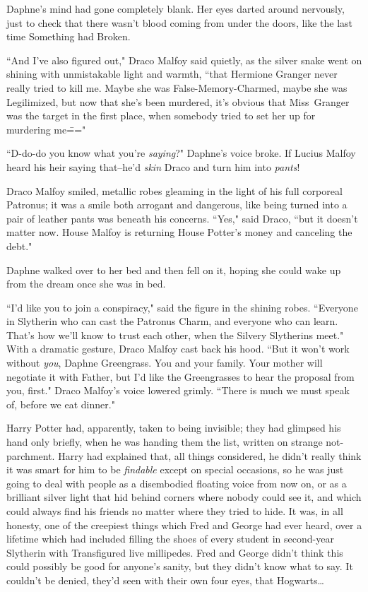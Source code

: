 Daphne's mind had gone completely blank. Her eyes darted around nervously, just to check that there wasn't blood coming from under the doors, like the last time Something had Broken.

``And I've also figured out," Draco Malfoy said quietly, as the silver snake went on shining with unmistakable light and warmth, ``that Hermione Granger never really tried to kill me. Maybe she was False-Memory-Charmed, maybe she was Legilimized, but now that she's been murdered, it's obvious that Miss~Granger was the target in the first place, when somebody tried to set her up for murdering me\==="

``D-do-do you know what you're \emph{saying}?" Daphne's voice broke. If Lucius Malfoy heard his heir saying that\---he'd \emph{skin} Draco and turn him into \emph{pants}!

Draco Malfoy smiled, metallic robes gleaming in the light of his full corporeal Patronus; it was a smile both arrogant and dangerous, like being turned into a pair of leather pants was beneath his concerns. ``Yes," said Draco, ``but it doesn't matter now. House Malfoy is returning House Potter's money and canceling the debt."

Daphne walked over to her bed and then fell on it, hoping she could wake up from the dream once she was in bed.

``I'd like you to join a conspiracy," said the figure in the shining robes. ``Everyone in Slytherin who can cast the Patronus Charm, and everyone who can learn. That's how we'll know to trust each other, when the Silvery Slytherins meet." With a dramatic gesture, Draco Malfoy cast back his hood. ``But it won't work without \emph{you}, Daphne Greengrass. You and your family. Your mother will negotiate it with Father, but I'd like the Greengrasses to hear the proposal from you, first." Draco Malfoy's voice lowered grimly. ``There is much we must speak of, before we eat dinner."

\later

Harry Potter had, apparently, taken to being invisible; they had glimpsed his hand only briefly, when he was handing them the list, written on strange not-parchment. Harry had explained that, all things considered, he didn't really think it was smart for him to be \emph{findable} except on special occasions, so he was just going to deal with people as a disembodied floating voice from now on, or as a brilliant silver light that hid behind corners where nobody could see it, and which could always find his friends no matter where they tried to hide. It was, in all honesty, one of the creepiest things which Fred and George had ever heard, over a lifetime which had included filling the shoes of every student in second-year Slytherin with Transfigured live millipedes. Fred and George didn't think this could possibly be good for anyone's sanity, but they didn't know what to say. It couldn't be denied, they'd seen with their own four eyes, that Hogwarts{\ldots}

